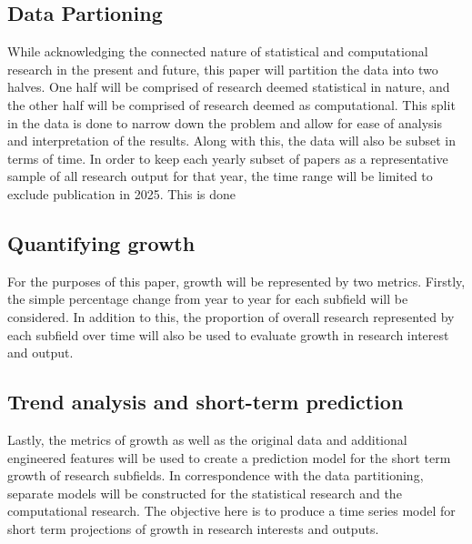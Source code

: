 \documentclass[
  12pt]{article}
\begin{document}
\subsection{Data Partioning}\label{data-partioning}

While acknowledging the connected nature of statistical and
computational research in the present and future, this paper will
partition the data into two halves. One half will be comprised of
research deemed statistical in nature, and the other half will be
comprised of research deemed as computational. This split in the data is
done to narrow down the problem and allow for ease of analysis and
interpretation of the results. Along with this, the data will also be
subset in terms of time. In order to keep each yearly subset of papers
as a representative sample of all research output for that year, the
time range will be limited to exclude publication in 2025. This is done

\subsection{Quantifying growth}\label{quantifying-growth}

For the purposes of this paper, growth will be represented by two
metrics. Firstly, the simple percentage change from year to year for
each subfield will be considered. In addition to this, the proportion of
overall research represented by each subfield over time will also be
used to evaluate growth in research interest and output.

\subsection{Trend analysis and short-term
prediction}\label{trend-analysis-and-short-term-prediction}

Lastly, the metrics of growth as well as the original data and
additional engineered features will be used to create a prediction model
for the short term growth of research subfields. In correspondence with
the data partitioning, separate models will be constructed for the
statistical research and the computational research. The objective here
is to produce a time series model for short term projections of growth
in research interests and outputs.


  
\end{document}
